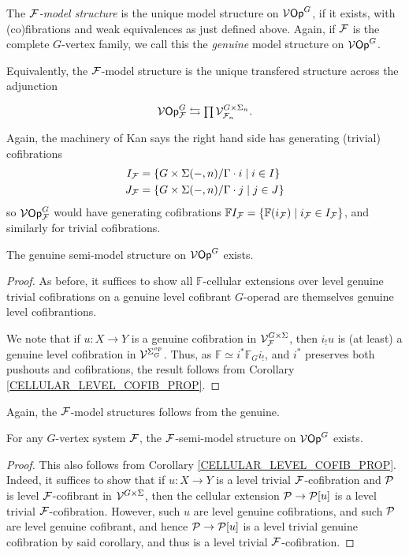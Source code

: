 \documentclass[a4paper,10pt]{article}%
\begin{document}
\begin{definition}
  The \textit{$\F$-model structure} is the unique model structure on $\V\Op^G$, if it exists, with (co)fibrations and weak equivalences as just defined above. Again, if $\F$ is the complete $G$-vertex family, we call this the \textit{genuine} model structure on $\V\Op^G$.
\end{definition}
Equivalently, the $\F$-model structure is the unique transfered structure across the adjunction
\[
\begin{tikzcd}
  \V\Op^G_\F \leftrightarrows \prod \V^{G \times \Sigma_n}_{\F_n}.
\end{tikzcd}
\]
Again, the machinery of Kan says the right hand side has generating (trivial) cofibrations
\begin{align*}
  I_\F &= \sets{G \times \Sigma(-,n)/\Gamma \cdot i}{i \in I}\\
  J_\F &= \sets{G \times \Sigma(-,n)/\Gamma \cdot j}{j \in J}
\end{align*}
so $\V\Op^G_\F$ would have generating cofibrations $\mathbb F I_\F = \sets{\mathbb F (i_\F)}{i_\F\in I_\F}$, and similarly for trivial cofibrations.




\begin{theorem}
  The genuine semi-model structure on $\V\Op^G$ exists.
\end{theorem}
\begin{proof}
  As before, it suffices to show all $\mathbb F$-cellular extensions over level genuine trivial cofibrations on a genuine level cofibrant $G$-operad are themselves genuine level cofibrantions.

  We note that if $u: X \to Y$ is a genuine cofibration in $\V^{G\times \Sigma}_\F$, then $i_! u$ is (at least) a genuine level cofibration in $\V^{\Sigma_G^{op}}$.
  Thus, as $\mathbb F \simeq i^*\mathbb F_G i_!$, and $i^*$ preserves both pushouts and cofibrations, the result follows from Corollary \ref{CELLULAR_LEVEL_COFIB_PROP}.
\end{proof}


Again, the $\F$-model structures follows from the genuine.
\begin{corollary} 
  For any $G$-vertex system $\F$, the $\F$-semi-model structure on $\V\Op^G$ exists.  
\end{corollary} 
\begin{proof} 
  This also follows from Corollary \ref{CELLULAR_LEVEL_COFIB_PROP}. Indeed, it suffices to show that if $u: X\to Y$ is a level trivial $\F$-cofibration and $\P$ is level $\F$-cofibrant in $\V^{G \times \Sigma}$, then the cellular extension $\P \to \P[u]$ is a level trivial $\F$-cofibration. However, such $u$ are level genuine cofibrations, and such $\P$ are level genuine cofibrant, and hence $\P \to \P[u]$ is a level trivial genuine cofibration by said corollary, and thus is a level trivial $\F$-cofibration. 
\end{proof} 
\end{document}
